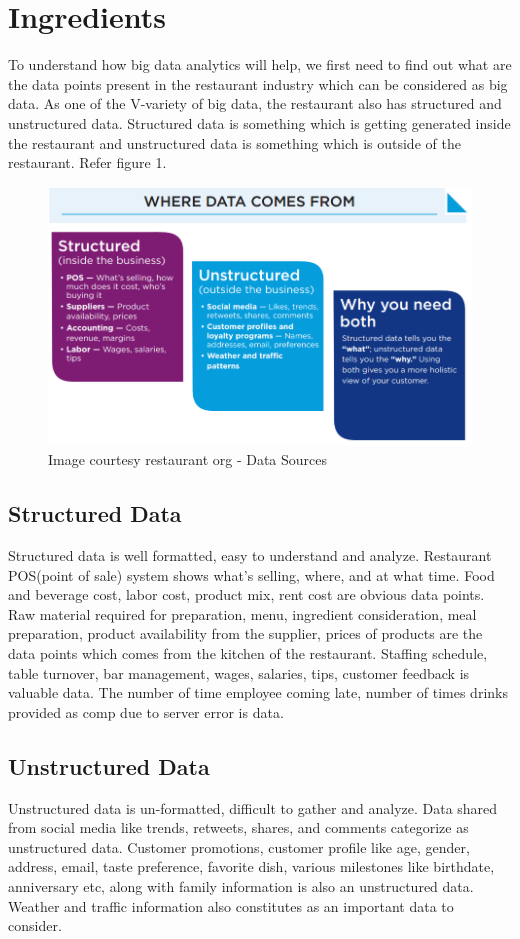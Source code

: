 \documentclass[sigconf]{acmart}
\begin{document}
\section{Ingredients}
To understand how big data analytics will help, we first need to find out what are the data points present in the restaurant industry which can be considered as big data. As one of the V-variety of big data, the restaurant also has structured and unstructured data. Structured data is something which is getting generated inside the restaurant and unstructured data is something which is outside of the restaurant. Refer figure 1.
\begin{figure}
\includegraphics{images/datasource}
\caption{Image courtesy restaurant org - Data Sources}
\end{figure}

\subsection{Structured Data}
Structured data is well formatted, easy to understand and analyze. Restaurant POS(point of sale) system shows what's selling, where, and at what time\cite{www-qsr}. Food and beverage cost, labor cost, product mix, rent cost are obvious data points. Raw material required for preparation, menu, ingredient consideration, meal preparation, product availability from the supplier, prices of products are the data points which comes from the kitchen of the restaurant. Staffing schedule, table turnover, bar management, wages, salaries, tips, customer feedback is valuable data. The number of time employee coming late, number of times drinks provided as comp due to server error is data.\cite{www-restaurant}
\subsection{Unstructured Data}
Unstructured data is un-formatted, difficult to gather and analyze. Data shared from social media like trends, retweets, shares, and comments categorize as unstructured data. Customer promotions, customer profile like age, gender, address, email, taste preference, favorite dish, various milestones like birthdate, anniversary etc, along with family information is also an unstructured data. Weather and traffic information also constitutes as an important data to consider. \cite{www-restaurant}
\end{document}
